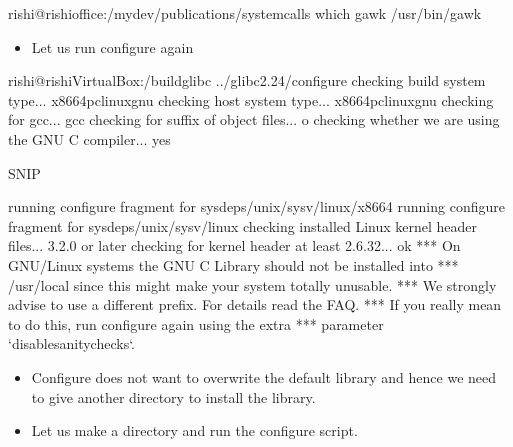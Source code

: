 \documentclass[letterpaper,10pt,english]{sphinxmanual}
\begin{document}
\begin{sphinxVerbatim}[commandchars=\\\{\}]
rishi@rishi\PYGZhy{}office:\PYGZti{}/mydev/publications/system\PYGZus{}calls\PYGZdl{} which gawk
/usr/bin/gawk
\end{sphinxVerbatim}
\begin{itemize}
\item {} 
Let us run configure again

\end{itemize}

\begin{sphinxVerbatim}[commandchars=\\\{\}]
rishi@rishi\PYGZhy{}VirtualBox:\PYGZti{}/build\PYGZus{}glibc\PYGZdl{} ../glibc\PYGZhy{}2.24/configure
checking build system type... x86\PYGZus{}64\PYGZhy{}pc\PYGZhy{}linux\PYGZhy{}gnu
checking host system type... x86\PYGZus{}64\PYGZhy{}pc\PYGZhy{}linux\PYGZhy{}gnu
checking for gcc... gcc
checking for suffix of object files... o
checking whether we are using the GNU C compiler... yes

\PYGZgt{}\PYGZgt{}\PYGZgt{}\PYGZgt{}\PYGZgt{}\PYGZgt{}\PYGZgt{}\PYGZgt{}\PYGZgt{}\PYGZgt{}SNIP\PYGZlt{}\PYGZlt{}\PYGZlt{}\PYGZlt{}\PYGZlt{}\PYGZlt{}\PYGZlt{}\PYGZlt{}\PYGZlt{}\PYGZlt{}\PYGZlt{}\PYGZlt{}\PYGZlt{}\PYGZlt{}\PYGZlt{}\PYGZlt{}\PYGZlt{}\PYGZlt{}\PYGZlt{}\PYGZlt{}\PYGZlt{}\PYGZlt{}

running configure fragment for sysdeps/unix/sysv/linux/x86\PYGZus{}64
running configure fragment for sysdeps/unix/sysv/linux
checking installed Linux kernel header files... 3.2.0 or later
checking for kernel header at least 2.6.32... ok
*** On GNU/Linux systems the GNU C Library should not be installed into
*** /usr/local since this might make your system totally unusable.
*** We strongly advise to use a different prefix.  For details read the FAQ.
*** If you really mean to do this, run configure again using the extra
*** parameter {}`\PYGZhy{}\PYGZhy{}disable\PYGZhy{}sanity\PYGZhy{}checks{}`.
\end{sphinxVerbatim}
\begin{itemize}
\item {} 
Configure does not want to overwrite the default library and hence we need to give another directory to install the library.

\item {} 
Let us make a directory and run the configure script.

\end{itemize}
\end{document}
